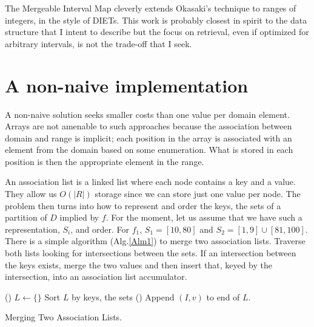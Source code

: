 \documentclass{article}
\begin{document}
The Mergeable Interval Map\cite{Bonichon2010} cleverly extends Okasaki's
technique to ranges of integers, in the style of DIETs.
This work is probably closest in spirit to the
data structure that I intent to describe but the focus on retrieval,
even if optimized for arbitrary intervals,
is not the trade-off that I seek.

\section{A non-naive implementation}

A non-naive solution seeks smaller costs than one value per domain element.
Arrays are not amenable to such approaches
because the association between domain and range is implicit;
each position in the array is associated with an element from the domain
based on some enumeration.
What is stored in each position is then the appropriate element in the range.

An association list is a linked list where each node contains a key and a value.
They allow us $O(|R|)$ storage since we can store just one value per node.
The problem then turns into how to represent and order the keys,
the sets of a partition of $D$ implied by $f$.
For the moment,
let us assume that we have such a representation,
$S_{i}$, and order.
For $f_{1}$, $S_{1} = [10,80]$ and $S_{2} = [1,9]\cup[81,100]$.
There is a simple algorithm (Alg.\ref{Alm1}) to merge two association lists.
Traverse both lists looking for intersections between the sets.
If an intersection between the keys exists,
merge the two values and then insert that,
keyed by the intersection,
into an association list accumulator.

\begin{algorithm}[H]
  \newcommand{\forcond}{$i=0$ \KwTo $n$}
  \DontPrintSemicolon
  \Fn(){}{
    $L \leftarrow \{\} $\;
    Sort $L$ by keys, the sets
  }
  \Fn(){}{
    Append $(I,v)$ to end of $L$.\;
  }
\caption{Merging Two Association Lists.\label{Alm1}}
\end{algorithm}
\end{document}
